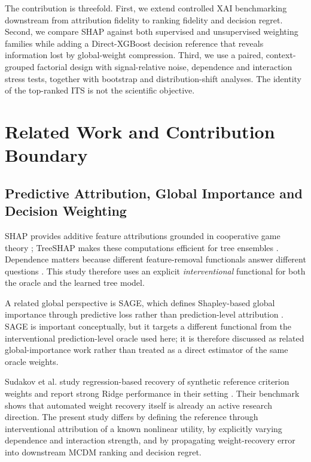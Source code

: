 \documentclass[runningheads]{llncs}
\begin{document}
The contribution is threefold. First, we extend controlled XAI benchmarking downstream from
attribution fidelity to ranking fidelity and decision regret. Second, we compare SHAP against
both supervised and unsupervised weighting families while adding a Direct-XGBoost decision
reference that reveals information lost by global-weight compression. Third, we use a paired,
context-grouped factorial design with signal-relative noise, dependence and interaction stress
tests, together with bootstrap and distribution-shift analyses. The identity of the top-ranked
ITS is not the scientific objective.

\section{Related Work and Contribution Boundary}
\label{sec:related}

\subsection{Predictive Attribution, Global Importance and Decision Weighting}

SHAP provides additive feature attributions grounded in cooperative game theory
\cite{lundberg2017shap}; TreeSHAP makes these computations efficient for tree ensembles
\cite{lundberg2020trees}. Dependence matters because different feature-removal functionals
answer different questions \cite{janzing2020causal,aas2021dependent}. This study therefore
uses an explicit \emph{interventional} functional for both the oracle and the learned tree
model.

A related global perspective is SAGE, which defines Shapley-based global importance through
predictive loss rather than prediction-level attribution \cite{covert2020sage}. SAGE is
important conceptually, but it targets a different functional from the interventional
prediction-level oracle used here; it is therefore discussed as related global-importance work
rather than treated as a direct estimator of the same oracle weights.

Sudakov et al. study regression-based recovery of synthetic reference criterion weights and
report strong Ridge performance in their setting \cite{sudakov2026weights}. Their benchmark
shows that automated weight recovery itself is already an active research direction. The
present study differs by defining the reference through interventional attribution of a known
nonlinear utility, by explicitly varying dependence and interaction strength, and by propagating
weight-recovery error into downstream MCDM ranking and decision regret.
\end{document}

